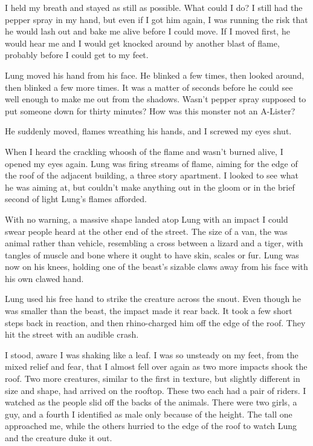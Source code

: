 I held my breath and stayed as still as possible. What could I do? I still had the pepper spray in my hand, but even if I got him again, I was running the risk that he would lash out and bake me alive before I could move. If I moved first, he would hear me and I would get knocked around by another blast of flame, probably before I could get to my feet.

Lung moved his hand from his face. He blinked a few times, then looked around, then blinked a few more times. It was a matter of seconds before he could see well enough to make me out from the shadows. Wasn't pepper spray supposed to put someone down for thirty minutes? How was this monster not an A-Lister?

He suddenly moved, flames wreathing his hands, and I screwed my eyes shut.

When I heard the crackling whoosh of the flame and wasn't burned alive, I opened my eyes again. Lung was firing streams of flame, aiming for the edge of the roof of the adjacent building, a three story apartment. I looked to see what he was aiming at, but couldn't make anything out in the gloom or in the brief second of light Lung's flames afforded.

With no warning, a massive shape landed atop Lung with an impact I could swear people heard at the other end of the street. The size of a van, the  was animal rather than vehicle, resembling a cross between a lizard and a tiger, with tangles of muscle and bone where it ought to have skin, scales or fur. Lung was now on his knees, holding one of the beast's sizable claws away from his face with his own clawed hand.

Lung used his free hand to strike the creature across the snout. Even though he was smaller than the beast, the impact made it rear back. It took a few short steps back in reaction, and then rhino-charged him off the edge of the roof. They hit the street with an audible crash.

I stood, aware I was shaking like a leaf. I was so unsteady on my feet, from the mixed relief and fear, that I almost fell over again as two more impacts shook the roof. Two more creatures, similar to the first in texture, but slightly different in size and shape, had arrived on the rooftop. These two each had a pair of riders. I watched as the people slid off the backs of the animals. There were two girls, a guy, and a fourth I identified as male only because of the height. The tall one approached me, while the others hurried to the edge of the roof to watch Lung and the creature duke it out.

